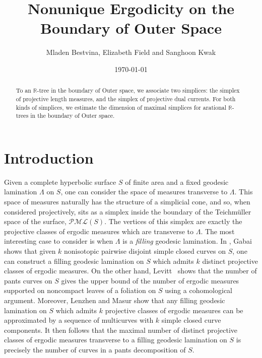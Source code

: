 \documentclass[11pt, letterpaper]{amsart}
\title{Nonunique Ergodicity on the Boundary of Outer Space}
\author[Bestvina, Field, and Kwak]{Mladen Bestvina, Elizabeth Field and Sanghoon Kwak}
\date{\today}
\theoremstyle{plain}
\theoremstyle{definition}
\newcommand{\R}{\mathbb{R}}
\begin{document}
\begin{abstract}
  To an $\R$-tree in the boundary of Outer space, we associate two simplices:
  the simplex of projective length measures, and the simplex of projective dual
  currents. For both kinds of simplices, we estimate the dimension of maximal
  simplices for arational $\mathbb{R}$-trees in the boundary of Outer
  space.
\end{abstract}

\maketitle





\section*{Introduction}

Given a complete hyperbolic surface $S$ of finite area and a fixed geodesic
lamination $\Lambda$ on $S$, one can  consider the space of measures transverse
to $\Lambda$. This space of measures naturally has the structure of a simplicial
cone, and so, when considered projectively, sits as a simplex inside the
boundary of the Teichm\"{u}ller space of the surface, $\mathcal{PML}(S)$. The
vertices of this simplex are exactly the projective classes of ergodic measures
which are transverse to $\Lambda$. The most interesting case to consider is when
$\Lambda$ is a \emph{filling} geodesic lamination. In \cite{gabai2009almost},
Gabai shows that given $k$ nonisotopic pairwise disjoint simple closed curves on $S$, one
can construct a filling geodesic lamination on $S$ which admits $k$ distinct
projective classes of ergodic measures.
On the other hand, Levitt~\cite{levitt1983} shows that the number of pants
curves on $S$ gives the upper bound of the number of ergodic measures supported on noncompact
leaves of a foliation on $S$ using a cohomological argument.
Moreover, Lenzhen and Masur
\cite{LM2010criteria} show that any filling geodesic lamination on $S$ which
admits $k$ projective classes of ergodic
measures can be approximated by a sequence of multicurves with $k$ simple closed
curve components.
It then follows that the maximal number of distinct projective classes of
ergodic measures transverse to a filling geodesic lamination on $S$ is precisely
the number of curves in a pants decomposition of $S$.
\end{document}
